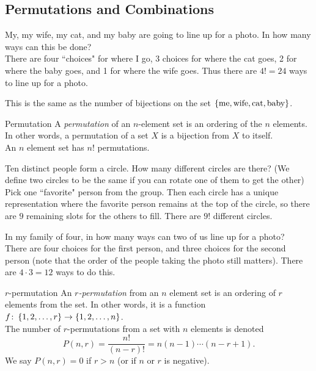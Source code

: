 \documentclass[class=article, crop=false]{standalone}
\begin{document}
  \subsection{Permutations and Combinations}
  \begin{example}{}
    My, my wife, my cat, and my baby are going to line up for a photo. In how many ways can this be done? \\[10pt]
    There are four ``choices" for where I go, 3 choices for where the cat goes, 2 for where the baby goes, and 1 for where the wife goes. Thus there are $4! = 24$ ways to line up for a photo.
  \end{example}
  \begin{note}{}
    This is the same as the number of bijections on the set $\left\{\text{me}, \text{wife}, \text{cat}, \text{baby}\right\}$.
  \end{note}
  \begin{definition}{Permutation}
    A \emph{permutation} of an $n$-element set is an ordering of the $n$ elements. In other words, a permutation of a set $X$ is a bijection from $X$ to itself. \\
    An $n$ element set has $n!$ permutations.
  \end{definition}
  \begin{example}{}
    Ten distinct people form a circle. How many different circles are there? (We define two circles to be the same if you can rotate one of them to get the other) \\[10pt]
    Pick one ``favorite" person from the group. Then each circle has a unique representation where the favorite person remains at the top of the circle, so there are $9$ remaining slots for the others to fill. There are $9!$ different circles.
  \end{example}
  \begin{example}{}
    In my family of four, in how many ways can two of us line up for a photo? \\[10pt]
    There are four choices for the first person, and three choices for the second person (note that the order of the people taking the photo still matters). There are $4 \cdot 3 = 12$ ways to do this.
  \end{example}
  \begin{definition}{$r$-permutation}
    An \emph{$r$-permutation} from an $n$ element set is an ordering of $r$ elements from the set. In other words, it is a function $f\colon \left\{1, 2, \dotsc , r\right\}\to \left\{1, 2, \dotsc , n\right\}$. \\
    The number of $r$-permutations from a set with $n$ elements is denoted
    \[
      P(n, r) = \frac{n!}{(n-r)!} = n(n-1)\dotsm(n-r+1).
    \]
    We say $P(n, r) = 0$ if $r > n$ (or if $n$ or $r$ is negative).
  \end{definition}
\end{document}
